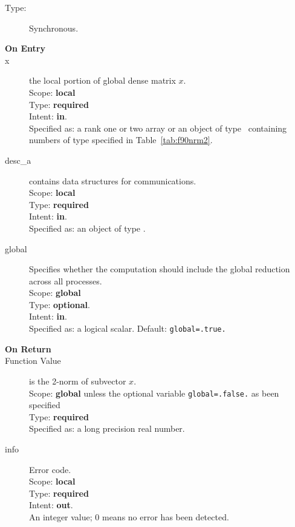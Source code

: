 \begin{description}
\item[Type:] Synchronous.
\item[\bf On Entry]
\item[x] the local portion of global dense matrix
$x$.%
\\
Scope: {\bf local} \\
Type: {\bf required} \\
Intent: {\bf in}.\\
Specified as:  a rank one or two array or an object of type \vdata\ 
containing numbers of type specified in
Table~\ref{tab:f90nrm2}.
\item[desc\_a] contains data structures for communications.\\
Scope: {\bf local} \\
Type: {\bf required}\\
Intent: {\bf in}.\\
Specified as: an object of type \descdata.
\item[global]  Specifies whether the computation should include the
  global reduction across all processes.\\
Scope: {\bf global} \\
Type: {\bf optional}.\\
Intent: {\bf in}.\\
Specified as: a logical scalar.
Default: \verb|global=.true.|\\%

\item[\bf On Return] 
\item[Function Value] is the 2-norm of subvector $x$.\\
Scope: {\bf global} unless the optional variable
\verb|global=.false.| as been specified\\
Type: {\bf required} \\
Specified as: a long precision real number.
\item[info] Error code.\\
Scope: {\bf local} \\
Type: {\bf required} \\
Intent: {\bf out}.\\
An integer value; 0 means no error has been detected. 
\end{description}

